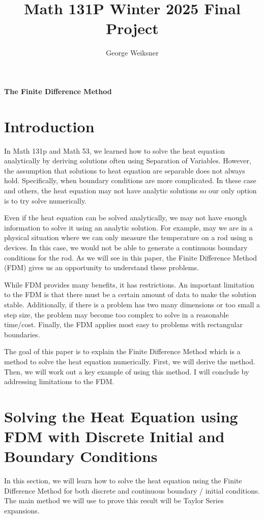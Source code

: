 \documentclass[12pt,letterpaper,reqno]{amsart}
\theoremstyle{definition}
\numberwithin{thm}{section}
\theoremstyle{remark}
\begin{document}
\onehalfspacing

\title{Math 131P Winter 2025 Final Project}
\author{George Weiksner}

\maketitle

\begin{center}
    \textbf{The Finite Difference Method}
\end{center}

\section{Introduction} \label{sec:introduction}
In Math 131p and Math 53, we learned how to solve the heat equation analytically by deriving solutions often using Separation of Variables. However, the assumption that solutions to heat equation are separable does not always hold. Specifically, when boundary conditions are more complicated. In these case and others, the heat equation may not have analytic solutions so our only option is to try solve numerically.   

Even if the heat equation can be solved analytically, we may not have enough information to solve it using an analytic solution. For example, may we are in a physical situation where we can only measure the temperature on a rod using n devices. In this case, we would not be able to generate a continuous boundary conditions for the rod. As we will see in this paper, the Finite Difference Method (FDM) gives us an opportunity to understand these problems. 

While FDM provides many benefits, it has restrictions. An important limitation to the FDM is that there must be a certain amount of data to make the solution stable. Additionally, if there is a problem has two many dimensions or too small a step size, the problem may become too complex to solve in a reasonable time/cost. Finally, the FDM applies most easy to problems with rectangular boundaries. 

The goal of this paper is to explain the Finite Difference Method which is a method to solve the heat equation numerically. First, we will derive the method. Then, we will work out a key example of using this method. I will conclude by addressing limitations to the FDM. 

\section{Solving the Heat Equation using FDM with Discrete Initial and Boundary Conditions}
\label{sec:fdm_heat}
In this section, we will learn how to solve the heat equation using the Finite Difference Method for both discrete and continuous boundary / initial conditions. The main method we will use to prove this result will be Taylor Series expansions. 
\end{document}
